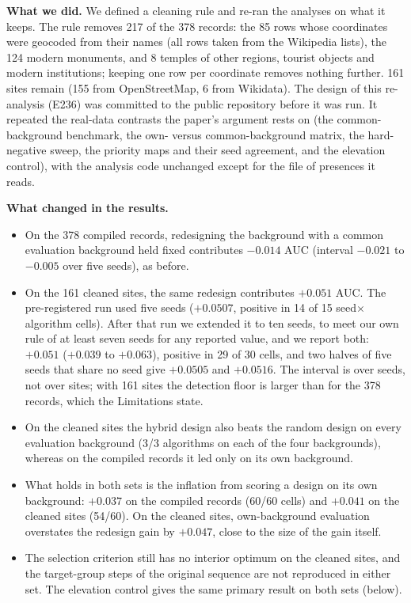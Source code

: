 \documentclass[11pt,a4paper]{article}
\begin{document}
\textbf{What we did.} We defined a cleaning rule and re-ran the analyses on what it keeps. The rule removes 217 of the
378 records: the 85 rows whose coordinates were geocoded from their names (all rows taken from the Wikipedia lists),
the 124 modern monuments, and 8 temples of other regions, tourist objects and modern institutions; keeping one row per
coordinate removes nothing further. 161 sites remain (155 from OpenStreetMap, 6 from Wikidata). The design of this
re-analysis (E236) was committed to the public repository before it was run. It repeated the real-data contrasts the
paper's argument rests on (the common-background benchmark, the own- versus common-background matrix, the hard-negative
sweep, the priority maps and their seed agreement, and the elevation control), with the analysis code unchanged except
for the file of presences it reads.

\textbf{What changed in the results.}
\begin{itemize}
  \item On the 378 compiled records, redesigning the background with a common evaluation background held fixed
        contributes $-0.014$ AUC (interval $-0.021$ to $-0.005$ over five seeds), as before.
  \item On the 161 cleaned sites, the same redesign contributes $+0.051$ AUC. The pre-registered run used five seeds
        ($+0.0507$, positive in 14 of 15 seed$\times$algorithm cells). After that run we extended it to ten seeds, to
        meet our own rule of at least seven seeds for any reported value, and we report both: $+0.051$ ($+0.039$ to
        $+0.063$), positive in 29 of 30 cells, and two halves of five seeds that share no seed give $+0.0505$ and
        $+0.0516$. The interval is over seeds, not over sites; with 161 sites the detection floor is larger than for
        the 378 records, which the Limitations state.
  \item On the cleaned sites the hybrid design also beats the random design on every evaluation background (3/3
        algorithms on each of the four backgrounds), whereas on the compiled records it led only on its own background.
  \item What holds in both sets is the inflation from scoring a design on its own background: $+0.037$ on the compiled
        records (60/60 cells) and $+0.041$ on the cleaned sites (54/60). On the cleaned sites, own-background
        evaluation overstates the redesign gain by $+0.047$, close to the size of the gain itself.
  \item The selection criterion still has no interior optimum on the cleaned sites, and the target-group steps of the
        original sequence are not reproduced in either set. The elevation control gives the same primary result on
        both sets (below).
\end{itemize}
\end{document}
